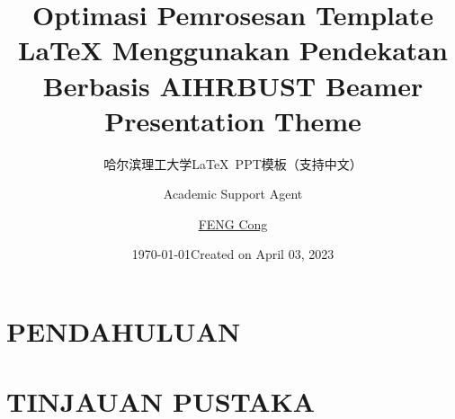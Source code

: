 \documentclass{sintefbeamer}
\title{Optimasi Pemrosesan Template LaTeX Menggunakan Pendekatan Berbasis AI}
\author{Academic Support Agent}
\date{\today}
\begin{document}
\maketitle

\begin{abstract}

\end{abstract}

\chapter{PENDAHULUAN}


\chapter{TINJAUAN PUSTAKA}



\title{HRBUST Beamer\\ Presentation Theme}
\subtitle{哈尔滨理工大学\LaTeX\ PPT模板（支持中文）}
\author{\href{mailto:cgsdfc@126.com}{FENG Cong}}
\date{Created on April 03, 2023}
\end{document}
